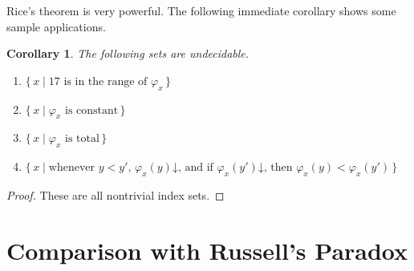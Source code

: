 \documentclass[10pt,a4paper]{article}
\theoremstyle{plain}
\newtheorem{cor}[thm]{Corollary}
\theoremstyle{definition}
\theoremstyle{remark}
\newcommand*{\olfileid}[3]{}
\newcommand*{\olsection}[1]{\section*{#1}}
\providecommand{\cfind}[1]{\varphi_{#1}}
\providecommand{\fdefined}{\mathord{\downarrow}}
\providecommand{\Setabs}[2]{\{\, #1 \mid #2 \,\}}
\begin{document}
Rice's theorem is very powerful. The following immediate corollary
shows some sample applications.
\begin{cor}
The following sets are undecidable.
\begin{enumerate}
\item $\Setabs{x}{\text{$17$ is in the range of $\cfind{x}$}}$
\item $\Setabs{x}{\text{$\cfind{x}$ is constant}}$
\item $\Setabs{x}{\text{$\cfind{x}$ is total}}$
\item $\Setabs{x}{\text{whenever $y < y'$, $\cfind{x}(y) \fdefined$, and
    if $\cfind{x}(y') \fdefined$, then $\cfind{x}(y) < \cfind{x}(y')$}}$
\end{enumerate}
\end{cor}

\begin{proof}
  These are all nontrivial index sets.
\end{proof}






\olfileid{cmp}{thy}{rus}
\olsection{Comparison with Russell's Paradox}
\end{document}
